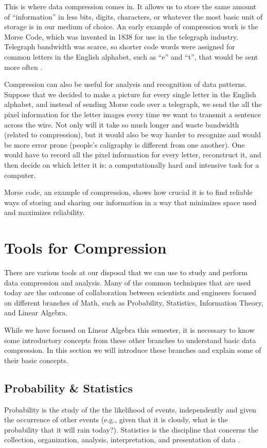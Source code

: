 \documentclass[12pt]{report}
\begin{document}
        This is where data compression comes in. It allows us to store the same amount of ``information'' in less bits, digits, characters, or whatever the most basic unit of storage is in our medium of choice. An early example of compression work is the Morse Code, which was invented in 1838 for use in the telegraph industry. Telegraph bandwidth was scarce, so shorter code words were assigned for common letters in the English alphabet, such as ``e'' and ``t'', that would be sent more often \cite{Wolfram2002}.

        Compression can also be useful for analysis and recognition of data patterns. Suppose that we decided to make a picture for every single letter in the English alphabet, and instead of sending Morse code over a telegraph, we send the all the pixel information for the letter images every time we want to transmit a sentence across the wire. Not only will it take so much longer and waste bandwidth (related to compression), but it would also be way harder to recognize and would be more error prone (people's caligraphy is different from one another). One would have to record all the pixel information for every letter, reconstruct it, and then decide on which letter it is: a computationally hard and intensive task for a computer.

        Morse code, an example of compression, shows how crucial it is to find reliable ways of storing and sharing our information in a way that minimizes space used and maximizes reliability.
    
    \chapter{Tools for Compression}
        There are various tools at our disposal that we can use to study and perform data compression and analysis. Many of the common techniques that are used today are the outcome of collaboration between scientists and engineers focused on different branches of Math, such as Probability, Statistics, Information Theory, and Linear Algebra.
        
        While we have focused on Linear Algebra this semester, it is necessary to know some introductory concepts from these other branches to understand basic data compression. In this section we will introduce these branches and explain some of their basic concepts.
        
        \section{Probability \& Statistics}
            Probability is the study of the the likelihood of events, independently and given the occurrence of other events (e.g., given that it is cloudy, what is the probability that it will rain today?). Statistics is the discipline that concerns the collection, organization, analysis, interpretation, and presentation of data \cite{wiki:Statistics}.
\end{document}

